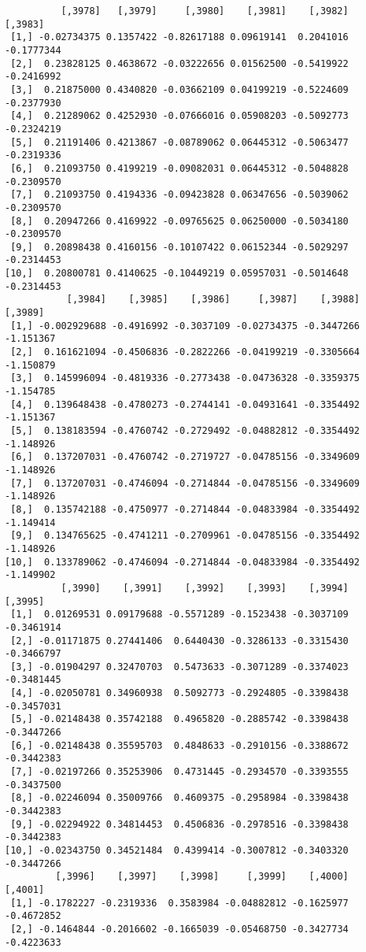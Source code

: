 \documentclass[
  letterpaper,
  DIV=11,
  numbers=noendperiod]{scrreprt}
\begin{document}
\begin{verbatim}
          [,3978]   [,3979]     [,3980]    [,3981]    [,3982]    [,3983]
 [1,] -0.02734375 0.1357422 -0.82617188 0.09619141  0.2041016 -0.1777344
 [2,]  0.23828125 0.4638672 -0.03222656 0.01562500 -0.5419922 -0.2416992
 [3,]  0.21875000 0.4340820 -0.03662109 0.04199219 -0.5224609 -0.2377930
 [4,]  0.21289062 0.4252930 -0.07666016 0.05908203 -0.5092773 -0.2324219
 [5,]  0.21191406 0.4213867 -0.08789062 0.06445312 -0.5063477 -0.2319336
 [6,]  0.21093750 0.4199219 -0.09082031 0.06445312 -0.5048828 -0.2309570
 [7,]  0.21093750 0.4194336 -0.09423828 0.06347656 -0.5039062 -0.2309570
 [8,]  0.20947266 0.4169922 -0.09765625 0.06250000 -0.5034180 -0.2309570
 [9,]  0.20898438 0.4160156 -0.10107422 0.06152344 -0.5029297 -0.2314453
[10,]  0.20800781 0.4140625 -0.10449219 0.05957031 -0.5014648 -0.2314453
           [,3984]    [,3985]    [,3986]     [,3987]    [,3988]   [,3989]
 [1,] -0.002929688 -0.4916992 -0.3037109 -0.02734375 -0.3447266 -1.151367
 [2,]  0.161621094 -0.4506836 -0.2822266 -0.04199219 -0.3305664 -1.150879
 [3,]  0.145996094 -0.4819336 -0.2773438 -0.04736328 -0.3359375 -1.154785
 [4,]  0.139648438 -0.4780273 -0.2744141 -0.04931641 -0.3354492 -1.151367
 [5,]  0.138183594 -0.4760742 -0.2729492 -0.04882812 -0.3354492 -1.148926
 [6,]  0.137207031 -0.4760742 -0.2719727 -0.04785156 -0.3349609 -1.148926
 [7,]  0.137207031 -0.4746094 -0.2714844 -0.04785156 -0.3349609 -1.148926
 [8,]  0.135742188 -0.4750977 -0.2714844 -0.04833984 -0.3354492 -1.149414
 [9,]  0.134765625 -0.4741211 -0.2709961 -0.04785156 -0.3354492 -1.148926
[10,]  0.133789062 -0.4746094 -0.2714844 -0.04833984 -0.3354492 -1.149902
          [,3990]    [,3991]    [,3992]    [,3993]    [,3994]    [,3995]
 [1,]  0.01269531 0.09179688 -0.5571289 -0.1523438 -0.3037109 -0.3461914
 [2,] -0.01171875 0.27441406  0.6440430 -0.3286133 -0.3315430 -0.3466797
 [3,] -0.01904297 0.32470703  0.5473633 -0.3071289 -0.3374023 -0.3481445
 [4,] -0.02050781 0.34960938  0.5092773 -0.2924805 -0.3398438 -0.3457031
 [5,] -0.02148438 0.35742188  0.4965820 -0.2885742 -0.3398438 -0.3447266
 [6,] -0.02148438 0.35595703  0.4848633 -0.2910156 -0.3388672 -0.3442383
 [7,] -0.02197266 0.35253906  0.4731445 -0.2934570 -0.3393555 -0.3437500
 [8,] -0.02246094 0.35009766  0.4609375 -0.2958984 -0.3398438 -0.3442383
 [9,] -0.02294922 0.34814453  0.4506836 -0.2978516 -0.3398438 -0.3442383
[10,] -0.02343750 0.34521484  0.4399414 -0.3007812 -0.3403320 -0.3447266
         [,3996]    [,3997]    [,3998]     [,3999]    [,4000]    [,4001]
 [1,] -0.1782227 -0.2319336  0.3583984 -0.04882812 -0.1625977 -0.4672852
 [2,] -0.1464844 -0.2016602 -0.1665039 -0.05468750 -0.3427734 -0.4223633

\end{verbatim}
\end{document}
